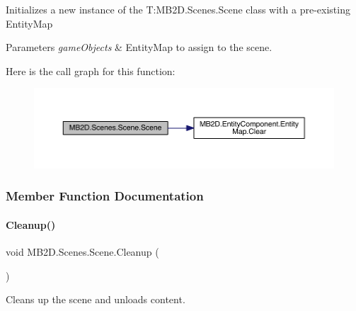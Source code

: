 Initializes a new instance of the T\+:\+M\+B2\+D.\+Scenes.\+Scene class with a pre-\/existing Entity\+Map 


\begin{DoxyParams}{Parameters}
{\em game\+Objects} & Entity\+Map to assign to the scene.\\
\hline
\end{DoxyParams}
Here is the call graph for this function\+:
\nopagebreak
\begin{figure}[H]
\begin{center}
\leavevmode
\includegraphics[width=350pt]{class_m_b2_d_1_1_scenes_1_1_scene_ac9cb0c45a98614e7e4c1307ebb6ef85e_cgraph}
\end{center}
\end{figure}


\subsubsection{Member Function Documentation}
\hypertarget{class_m_b2_d_1_1_scenes_1_1_scene_a3ee3777b94ccff0a739e75ca1ca151c6}{}\label{class_m_b2_d_1_1_scenes_1_1_scene_a3ee3777b94ccff0a739e75ca1ca151c6} 
\paragraph{\texorpdfstring{Cleanup()}{Cleanup()}}
{\footnotesize\ttfamily void M\+B2\+D.\+Scenes.\+Scene.\+Cleanup (\begin{DoxyParamCaption}{ }\end{DoxyParamCaption})\hspace{0.3cm}{\ttfamily [inline]}}



Cleans up the scene and unloads content. 

